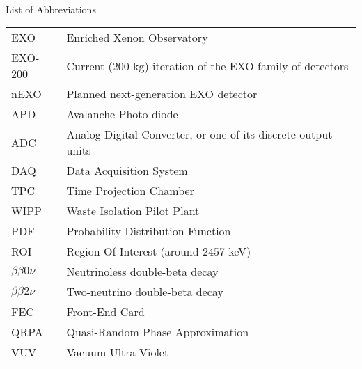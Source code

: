 
\renewcommand{\baselinestretch}{1}
\small\normalsize
\hbox{\ }

\vspace{-4em}

\begin{center}
\large{List of Abbreviations}
\end{center} 

\vspace{3pt}

\begin{tabular}{ll}
EXO & Enriched Xenon Observatory\\
EXO-200 & Current (200-kg) iteration of the EXO family of detectors \\
nEXO & Planned next-generation EXO detector \\
APD & Avalanche Photo-diode \\
ADC & Analog-Digital Converter, or one of its discrete output units \\
DAQ & Data Acquisition System \\
TPC & Time Projection Chamber \\
WIPP & Waste Isolation Pilot Plant \\
PDF & Probability Distribution Function \\
ROI & Region Of Interest (around $2457$ keV) \\
$\beta\beta 0\nu$ & Neutrinoless double-beta decay \\
$\beta\beta 2\nu$ & Two-neutrino double-beta decay \\
FEC & Front-End Card \\
QRPA & Quasi-Random Phase Approximation \\
VUV & Vacuum Ultra-Violet
\end{tabular}
